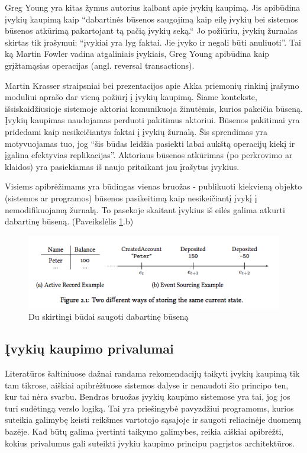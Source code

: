 Greg Young yra kitas žymus autorius kalbant apie įvykių kaupimą. Jis apibūdina įvykių kaupimą kaip “dabartinės būsenos saugojimą kaip eilę įvykių bei sistemos būsenos atkūrimą pakartojant tą pačią įvykių seką.“ \cite{Young:CQRS2010} Jo požiūriu, įvykių žurnalas skirtas tik įrašymui: “įvykiai yra lyg faktai. Jie įvyko ir negali būti anuliuoti”. \cite{Young:CQRS2013} Tai ką Martin Fowler vadina atgaliniais įvykiais, Greg Young apibūdina kaip grįžtamąsias operacijas (angl. reversal transactions).

Martin Krasser straipsniai bei prezentacijos apie Akka priemonių rinkinį įrašymo moduliui aprašo dar vieną požiūrį į įvykių kaupimą. \cite{Krasser:AkkaPersistence, Krasser:AkkaYoutube} Šiame kontekste, išsiskaidžiusioje sistemoje aktoriai komunikuoja žinutėmis, kurios pakeičia būseną. Įvykių kaupimas naudojamas perduoti pakitimus aktoriui. Būsenos pakitimai yra pridedami kaip nesikeičiantys faktai į įvykių žurnalą. Šis sprendimas yra motyvuojamas tuo, jog “šis būdas leidžia pasiekti labai aukštą operacijų kiekį ir įgalina efektyvias replikacijas”. Aktoriaus būsenos atkūrimas (po perkrovimo ar klaidos) yra pasiekiamas iš naujo pritaikant jau įrašytus įvykius.


Visiems apibrėžimams yra būdingas vienas bruožas - publikuoti kiekvieną objekto (sistemos ar programos) būsenos pasikeitimą kaip nesikeičiantį įvykį į nemodifikuojamą žurnalą. To pasekoje skaitant įvykius iš eilės galima atkurti dabartinę būseną. (Paveikslėlis \ref{img:current_state}.b)

\begin{figure}[H]
    \centering
    \includegraphics[scale=0.8]{img/current_state}
    \caption{Du skirtingi būdai saugoti dabartinę būseną}
    \label{img:current_state}
\end{figure}

\subsection{Įvykių kaupimo privalumai}

Literatūros šaltiniuose dažnai randama rekomendacijų taikyti įvykių kaupimą tik tam tikrose, aiškiai apibrėžtuose sistemos dalyse ir nenaudoti šio principo ten, kur tai nėra svarbu. \cite{Betts:2013:ECE:2509680} Bendras bruožas įvykių kaupimo sistemose yra tai, jog jos turi sudėtingą verslo logiką. Tai yra priešingybė pavyzdžiui programoms, kurios suteikia galimybę keisti reikšmes vartotojo sąsajoje ir saugoti reliacinėje duomenų bazėje. Kad būtų galima įvertinti taikymo galimybes, reikia aiškiai apibrėžti, kokius privalumus gali suteikti įvykiu kaupimo principu pagrįstos architektūros.


